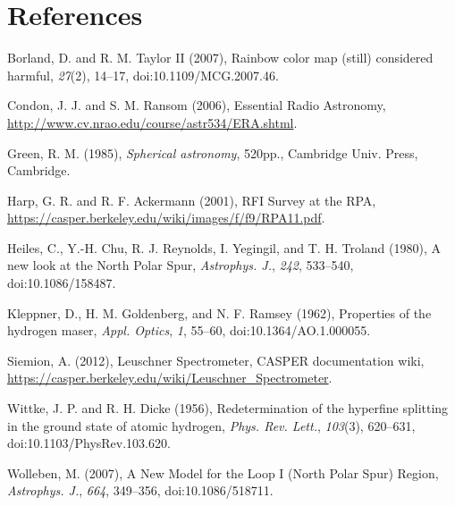 \documentclass[10pt]{article}
\begin{document}
\section{References}

\hangindent 0.25in Borland, D. and R. M. Taylor II (2007), Rainbow color map (still) considered harmful, \textit{27}(2), 14--17, doi:10.1109/MCG.2007.46.

\hangindent 0.25in Condon, J. J. and S. M. Ransom (2006), Essential Radio Astronomy, \\
\href{http://www.cv.nrao.edu/course/astr534/ERA.shtml}
{http://www.cv.nrao.edu/course/astr534/ERA.shtml}.

\hangindent 0.25in Green, R. M. (1985), \textit{Spherical astronomy}, 520pp.,
Cambridge Univ. Press, Cambridge.

\hangindent 0.25in Harp, G. R. and R. F. Ackermann (2001), RFI Survey at the RPA, \\ \href{https://casper.berkeley.edu/wiki/images/f/f9/RPA11.pdf}{https://casper.berkeley.edu/wiki/images/f/f9/RPA11.pdf}.

\hangindent 0.25in Heiles, C., Y.-H. Chu, R. J. Reynolds, I. Yegingil, and T. H. Troland (1980), A new look at the North Polar Spur, \textit{Astrophys. J.}, \textit{242}, 533--540, doi:10.1086/158487.

\hangindent 0.25in Kleppner, D., H. M. Goldenberg, and N. F. Ramsey (1962), Properties of the hydrogen maser, \textit{Appl. Optics}, \textit{1}, 55--60, doi:10.1364/AO.1.000055.

\hangindent 0.25in Siemion, A. (2012), Leuschner Spectrometer, CASPER documentation wiki, \\
\href{https://casper.berkeley.edu/wiki/Leuschner\_Spectrometer}
{https://casper.berkeley.edu/wiki/Leuschner\_Spectrometer}.

\hangindent 0.25in Wittke, J. P. and R. H. Dicke (1956), Redetermination of the hyperfine splitting in the ground state of atomic hydrogen, \textit{Phys. Rev. Lett.}, \textit{103}(3), 620--631, doi:10.1103/PhysRev.103.620.

\hangindent 0.25in Wolleben, M. (2007), A New Model for the Loop I (North Polar
Spur) Region, \textit{Astrophys. J.}, \textit{664}, 349--356,
doi:10.1086/518711.
\end{document}
